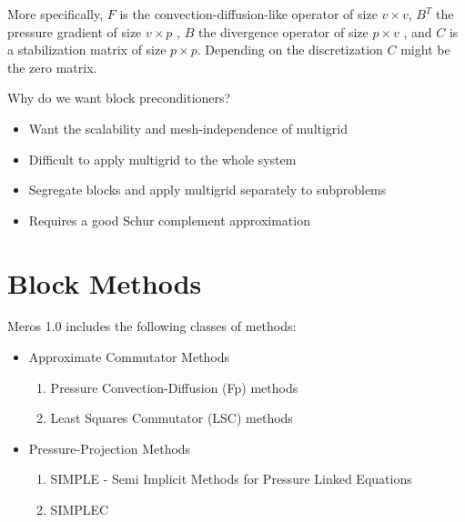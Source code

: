 \documentclass[oneeqnum,onefignum,onetabnum,10pt]{SANDreport}
\begin{document}
More specifically, $F$ is the convection-diffusion-like operator of
size $v \times v$, $B^T$ the pressure gradient of size $v \times p$ ,
$B$ the divergence operator of size $p \times v$ , and $C$ is a
stabilization matrix of size $p \times p$.  Depending on the
discretization $C$ might be the zero matrix.

Why do we want block preconditioners?

\begin{itemize}
\item Want the scalability and mesh-independence of multigrid 
\item Difficult to apply multigrid to the whole system 
\item Segregate blocks and apply multigrid separately to subproblems 
\item Requires a good Schur complement approximation 
\end{itemize}

\section{Block Methods}\label{index_methods}
Meros 1.0 includes the following classes of methods:

\begin{itemize}
\item Approximate Commutator Methods
\begin{enumerate}
 \item Pressure Convection-Diffusion (Fp) methods 
 \item Least Squares Commutator (LSC) methods 
\end{enumerate}
\item Pressure-Projection Methods
\begin{enumerate}
 \item SIMPLE - Semi Implicit Methods for Pressure Linked Equations 
 \item SIMPLEC 
\end{enumerate}
\end{itemize}
\end{document}
